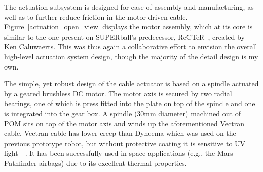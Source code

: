\documentclass[12pt]{report}
\begin{document}

The actuation subsystem is designed for ease of assembly and manufacturing, as well as to further reduce friction in the motor-driven cable.
Figure~\ref{actuation_open_view} displays the motor assembly, 
which at its core is similar to the one present on SUPERball's predecessor, ReCTeR~\cite{Caluwaerts2013rsif}, created by Ken Caluwaerts.
This was thus again a collaborative effort to envision the overall high-level actuation system design, though the majority of the detail design is my own.



The simple, yet robust design of the cable actuator is based on a spindle actuated by a geared brushless DC motor.
The motor axis is secured by two radial bearings, one  of which is press fitted into the plate on top of the spindle and one is integrated into the gear box.
A spindle (30mm diameter) machined out of POM sits on top of the motor axis and winds up the aforementioned Vectran cable.
Vectran cable has lower creep than Dyneema which was used on the previous prototype robot, 
but without protective coating it is sensitive to UV light~\cite{fette2004vectran}~\cite{said2006investigation}.
It has been successfully used in space applications (e.g., the Mars Pathfinder airbags) due to its excellent thermal properties.
\end{document}
